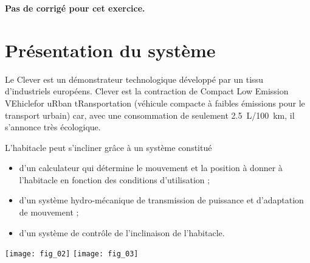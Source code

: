 \normaltrue \difficilefalse \tdifficilefalse
\correctionfalse




\setcounter{numques}{0}
\ifcorrection
\else
\textbf{Pas de corrigé pour cet exercice.}
\fi

\section*{Présentation du système}

Le Clever est un démonstrateur technologique développé par un tissu d'industriels européens. Clever est la contraction de Compact Low Emission VEhiclefor uRban tRansportation (véhicule compacte à faibles émissions pour le transport urbain) car, avec une consommation de seulement \SI{2,5}{L}/\SI{100}{km}, il s'annonce très écologique. 

L'habitacle peut s'incliner grâce à un système constitué 
\begin{itemize}
\item d'un calculateur qui détermine le mouvement et la position à donner à l'habitacle en fonction des conditions d'utilisation ;
\item d'un système hydro-mécanique de transmission de puissance et d'adaptation de mouvement ;
\item d'un système de contrôle de l'inclinaison de l'habitacle.
\end{itemize}

\begin{center}
\texttt{[image: fig\_02]}
\texttt{[image: fig\_03]}
\end{center}

